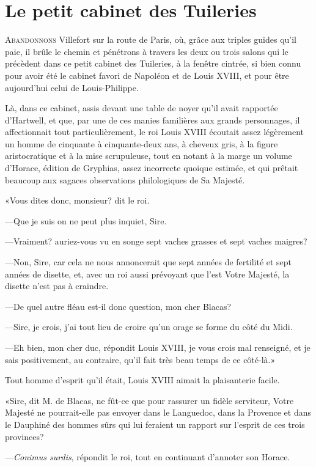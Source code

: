 \chapter{Le petit cabinet des Tuileries}

\lettrine{A}{bandonnons} Villefort sur la route de Paris, où, grâce aux triples guides qu'il paie, il brûle le chemin et pénétrons à travers les deux ou trois salons qui le précèdent dans ce petit cabinet des Tuileries, à la fenêtre cintrée, si bien connu pour avoir été le cabinet favori de Napoléon et de Louis XVIII, et pour être aujourd'hui celui de Louis-Philippe.

Là, dans ce cabinet, assis devant une table de noyer qu'il avait rapportée d'Hartwell, et que, par une de ces manies familières aux grands personnages, il affectionnait tout particulièrement, le roi Louis XVIII écoutait assez légèrement un homme de cinquante à cinquante-deux ans, à cheveux gris, à la figure aristocratique et à la mise scrupuleuse, tout en notant à la marge un volume d'Horace, édition de Gryphias, assez incorrecte quoique estimée, et qui prêtait beaucoup aux sagaces observations philologiques de Sa Majesté.

«Vous dites donc, monsieur? dit le roi.

—Que je suis on ne peut plus inquiet, Sire.

—Vraiment? auriez-vous vu en songe sept vaches grasses et sept vaches maigres?

—Non, Sire, car cela ne nous annoncerait que sept années de fertilité et sept années de disette, et, avec un roi aussi prévoyant que l'est Votre Majesté, la disette n'est pas à craindre.

—De quel autre fléau est-il donc question, mon cher Blacas?

—Sire, je crois, j'ai tout lieu de croire qu'un orage se forme du côté du Midi.

—Eh bien, mon cher duc, répondit Louis XVIII, je vous crois mal renseigné, et je sais positivement, au contraire, qu'il fait très beau temps de ce côté-là.»

Tout homme d'esprit qu'il était, Louis XVIII aimait la plaisanterie facile.

«Sire, dit M. de Blacas, ne fût-ce que pour rassurer un fidèle serviteur, Votre Majesté ne pourrait-elle pas envoyer dans le Languedoc, dans la Provence et dans le Dauphiné des hommes sûrs qui lui feraient un rapport sur l'esprit de ces trois provinces?

—\textit{Conimus surdis}, répondit le roi, tout en continuant d'annoter son Horace.

